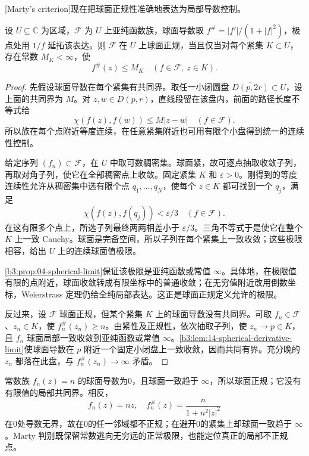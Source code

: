 [Marty's criterion]现在把球面正规性准确地表达为局部导数控制。

\begin{theorem}[Marty 判别]\label{b3:thm:14-marty}
设 \(U\subseteq\mathbb C\) 为区域，\(\mathcal F\) 为 \(U\) 上亚纯函数族，球面导数取 \(f^\#=|f'|/(1+|f|^2)\)，极点处用 \(1/f\) 延拓该表达。则 \(\mathcal F\) 在 \(U\) 上球面正规，当且仅当对每个紧集 \(K\subset U\)，存在常数 \(M_K<\infty\)，使
\[
 f^\#(z)\le M_K
 \quad(f\in\mathcal F,\ z\in K).
\]
\end{theorem}
\begin{proof}
先假设球面导数在每个紧集有共同界。取任一小闭圆盘 \(\overline{D(p,2r)}\subset U\)，设上面的共同界为 \(M\)。对 \(z,w\in D(p,r)\)，直线段留在该盘内，前面的路径长度不等式给
\[
 \chi(f(z),f(w))\le M|z-w|
 \quad(f\in\mathcal F).
\]
所以族在每个点附近等度连续，在任意紧集附近也可用有限个小盘得到统一的连续性控制。

给定序列 \((f_n)\subset\mathcal F\)，在 \(U\) 中取可数稠密集。球面紧，故可逐点抽取收敛子列，再取对角子列，使它在全部稠密点上收敛。固定紧集 \(K\) 和 \(\varepsilon>0\)。刚得到的等度连续性允许从稠密集中选有限个点 \(q_1,\ldots,q_N\)，使每个 \(z\in K\) 都可找到一个 \(q_j\)，满足
\[
 \chi(f(z),f(q_j))<\varepsilon/3
 \quad(f\in\mathcal F).
\]
在这有限多个点上，所选子列最终两两相差小于 \(\varepsilon/3\)。三角不等式于是使它在整个 \(K\) 上一致 Cauchy。球面是完备空间，所以子列在每个紧集上一致收敛；这些极限相容，给出 \(U\) 上的连续球面值极限。

\cref{b3:prop:04-spherical-limit}保证该极限是亚纯函数或常值 \(\infty\)。具体地，在极限值有限的点附近，球面收敛转成有限坐标中的普通收敛；在无穷值附近改用倒数坐标，Weierstrass 定理仍给全纯局部表达。这正是球面正规定义允许的极限。

反过来，设 \(\mathcal F\) 球面正规，但某个紧集 \(K\) 上的球面导数没有共同界。可取 \(f_n\in\mathcal F\)、\(z_n\in K\)，使 \(f_n^\#(z_n)\ge n\)。由紧性及正规性，依次抽取子列，使 \(z_n\to p\in K\)，且 \(f_n\) 球面局部一致收敛到亚纯函数或常值 \(\infty\)。\cref{b3:lem:14-spherical-derivative-limit}使球面导数在 \(p\) 附近一个固定小闭盘上一致收敛，因而共同有界。充分晚的 \(z_n\) 都落在此盘，与 \(f_n^\#(z_n)\to\infty\) 矛盾。
\end{proof}

常数族 \(f_n(z)=n\) 的球面导数为0，且球面一致趋于 \(\infty\)，所以球面正规；它没有有限值的局部共同界。相反，
\[
 f_n(z)=nz,\quad f_n^\#(z)=\frac{n}{1+n^2|z|^2}
\]
在0处导数无界，故在0的任一邻域都不正规；在避开0的紧集上却球面一致趋于 \(\infty\)。Marty 判别既保留常数逃向无穷远的正常极限，也能定位真正的局部不正规点。

